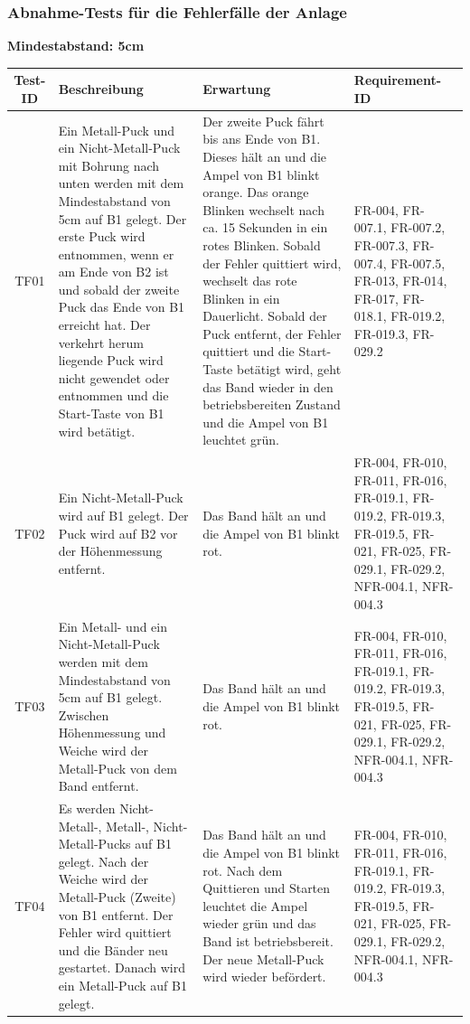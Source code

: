 \documentclass[oneside,a4paper,titlepage]{scrartcl}              %
\begin{document}
\newpage

\subsubsection{Abnahme-Tests für die Fehlerfälle der Anlage}
\textbf{Mindestabstand: 5cm}
\begin{small}
  \begin{center}
    \begin{longtable}{|c|p{4cm}|p{6cm}|C{3cm}|}
      \hline
      \textbf{Test-ID} & \textbf{Beschreibung} & \textbf{Erwartung} & \textbf{Requirement-ID}\\
      \toprule
      \endhead
      \hline
      TF01 & Ein Metall-Puck und ein Nicht-Metall-Puck mit Bohrung nach unten werden mit dem Mindestabstand von 5cm auf B1 gelegt. Der erste Puck wird entnommen, wenn er am Ende von B2 ist und sobald der zweite Puck das Ende von B1 erreicht hat. Der verkehrt herum liegende Puck wird nicht gewendet oder entnommen und die Start-Taste von B1 wird betätigt. & Der zweite Puck fährt bis ans Ende von B1. Dieses hält an und die Ampel von B1 blinkt orange. Das orange Blinken wechselt nach ca. 15 Sekunden in ein rotes Blinken. Sobald der Fehler quittiert wird, wechselt das rote Blinken in ein Dauerlicht. Sobald der Puck entfernt, der Fehler quittiert und die Start-Taste betätigt wird, geht das Band wieder in den betriebsbereiten Zustand und die Ampel von B1 leuchtet grün. & FR-004, FR-007.1, FR-007.2, FR-007.3, FR-007.4, FR-007.5, FR-013, FR-014, FR-017, FR-018.1, FR-019.2, FR-019.3, FR-029.2\\
      \hline
       TF02 & Ein Nicht-Metall-Puck wird auf B1 gelegt. Der Puck wird auf B2 vor der Höhenmessung entfernt. & Das Band hält an und die Ampel von B1 blinkt rot. & FR-004, FR-010, FR-011, FR-016, FR-019.1, FR-019.2, FR-019.3, FR-019.5, FR-021, FR-025, FR-029.1, FR-029.2, NFR-004.1, NFR-004.3\\
      \hline
      TF03 & Ein Metall- und ein Nicht-Metall-Puck werden mit dem Mindestabstand von 5cm auf B1 gelegt. Zwischen Höhenmessung und Weiche wird der Metall-Puck von dem Band entfernt. & Das Band hält an und die Ampel von B1 blinkt rot. & FR-004, FR-010, FR-011, FR-016, FR-019.1, FR-019.2, FR-019.3, FR-019.5, FR-021, FR-025, FR-029.1, FR-029.2, NFR-004.1, NFR-004.3\\
      \hline
       TF04 & Es werden Nicht-Metall-, Metall-, Nicht-Metall-Pucks auf B1 gelegt. Nach der Weiche wird der Metall-Puck (Zweite) von B1 entfernt. Der Fehler wird quittiert und die Bänder neu gestartet. Danach wird ein Metall-Puck auf B1 gelegt. & Das Band hält an und die Ampel von B1 blinkt rot. Nach dem Quittieren und Starten leuchtet die Ampel wieder grün und das Band ist betriebsbereit. Der neue Metall-Puck wird wieder befördert. & FR-004, FR-010, FR-011, FR-016, FR-019.1, FR-019.2, FR-019.3, FR-019.5, FR-021, FR-025, FR-029.1, FR-029.2, NFR-004.1, NFR-004.3\\

\end{longtable}
\end{center}
\end{small}
\end{document}
